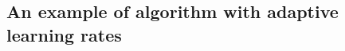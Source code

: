 \subsection{An example of algorithm with adaptive learning rates}
\begin{comment}
                    \begin{algorithm}[H]
                    \caption{RMSProp algorithm}\label{alg:RMSPROP}
                    \begin{algorithmic}[1]
                    \Require Global learning rate $\eta$, decay rate $\rho$
                    \Require Initial parameter $\theta$
                    \Require Small constant $\delta$, usually $10^{-6}$, used to stabilize division by small numbers
                    \Require Minibatch dimension $m$
                    
                    \Procedure{RMSProp}{$\{x^{(i)}\}_{i=1,\dots,n}$} \Comment Take as input a dataset of $n$ elements
                    
                    \State Initialize accumulation variables $r=0$
                    
                    \While{stopping criterion not met}
                    \State Sample a minibatch $\{x^{(1)},\dots,x^{(m)}\}$ from the training set with corresponding targets $y^{(i)}$.
                    \State $\hat{g} \gets + \frac{1}{m} \nabla_{\mathbf{\theta}} \sum_{i} L(f(x^{(i)};\mathbf{\theta}), y^{(i)})$ \Comment{Compute gradient estimate}
                    \State $r \gets \rho r + (1-\rho)g \odot g$ \Comment Accumulate squared gradient
                    \State $\Delta \theta = - \frac{\epsilon}{\sqrt{\delta + r}} \odot g$ \Comment Compute parameter update
                    \State $\mathbf{\theta} \gets \mathbf{\theta} + \Delta \mathbf{\theta}$
                    \EndWhile
                    
                    \State \textbf{return} $\mathbf{\theta}$
                    \EndProcedure
                    \end{algorithmic}
                    \end{algorithm}
\end{comment}


